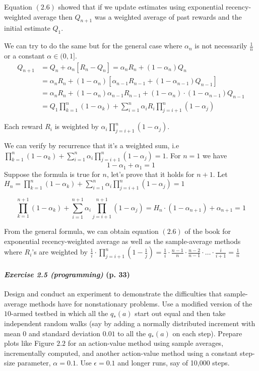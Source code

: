 \documentclass[10pt,a4paper]{article}
\begin{document}
Equation $(2.6)$ showed that if we update estimates using exponential recency-weighted average then $Q_{n+1}$ was a weighted average of past rewards and the initial estimate $Q_1$.

We can try to do the same but for the general case where $\alpha_n$ is not necessarily $\frac{1}{n}$ or a constant $\alpha \in (0,1]$.
\begin{equation}
\begin{split}
Q_{n+1} &= Q_n + \alpha_n [R_n - Q_n] = \alpha_n R_n + (1-\alpha_n) Q_n\\
&= \alpha_n R_n + (1-\alpha_n) [\alpha_{n-1} R_{n-1} + (1-\alpha_{n-1})Q_{n-1}]\\
&= \alpha_n R_n + (1-\alpha_n) \alpha_{n-1} R_{n-1} + (1-\alpha_n)\cdot (1-\alpha_{n-1})Q_{n-1}\\
&= Q_1 \prod_{k=1}^n (1-\alpha_k) + \sum_{i=1}^n \alpha_i R_i \prod_{j=i+1}^n (1-\alpha_j)
\end{split}
\end{equation}

Each reward $R_i$ is weighted by $\alpha_i \prod_{j=i+1}^n (1-\alpha_j)$.

\bigskip
We can verify by recurrence that it's a weighted sum, i.e $\prod_{k=1}^n (1-\alpha_k) + \sum_{i=1}^n \alpha_i \prod_{j=i+1}^n (1-\alpha_j) = 1$. For $n=1$ we have
\begin{equation}
1-\alpha_1 + \alpha_1 = 1
\end{equation}
Suppose the formula is true for $n$, let's prove that it holds for $n+1$. Let $H_n = \prod_{k=1}^n (1-\alpha_k) + \sum_{i=1}^n \alpha_i \prod_{j=i+1}^n (1-\alpha_j) = 1$

\begin{equation}
\prod_{k=1}^{n+1} (1-\alpha_k) + \sum_{i=1}^{n+1} \alpha_i \prod_{j=i+1}^{n+1} (1-\alpha_j) = H_n \cdot (1-\alpha_{n+1}) + \alpha_{n+1} = 1
\end{equation}

From the general formula, we can obtain equation $(2.6)$ of the book for exponential recency-weighted average as well as the sample-average methods where $R_i$'s are weighted by $\frac{1}{i} \cdot \prod_{j=i+1}^n \left(1-\frac{1}{j}\right) = \frac{1}{i} \cdot \frac{n-1}{n} \cdot \frac{n-2}{n-1} \cdot \hdots \cdot \frac{i}{i+1} = \frac{1}{n}$

\paragraph{\textit{Exercise 2.5 (programming)} (p. 33)} Design and conduct an experiment to demonstrate the
difficulties that sample-average methods have for nonstationary problems. Use a modified version of the $10$-armed testbed in which all the $q_*(a)$ start out equal and then take independent random walks (say by adding a normally distributed increment with mean $0$ and standard deviation $0.01$ to all the $q_*(a)$ on each step). Prepare plots like Figure $2.2$
for an action-value method using sample averages, incrementally computed, and another action-value method using a constant step-size parameter, $\alpha = 0.1$. Use $\epsilon = 0.1$ and
longer runs, say of 10,000 steps.
\end{document}
